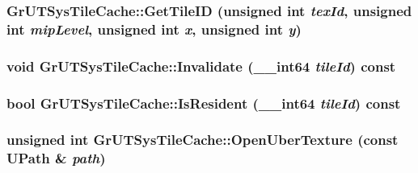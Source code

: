 \hypertarget{class_gr_u_t_sys_tile_cache_0ade69d8a7eb2491b6c19b5dba8f1866}{
\subsubsection[{GetTileID}]{ GrUTSysTileCache::GetTileID (unsigned int {\em texId}, \/  unsigned int {\em mipLevel}, \/  unsigned int {\em x}, \/  unsigned int {\em y})}}
\label{class_gr_u_t_sys_tile_cache_0ade69d8a7eb2491b6c19b5dba8f1866}


\hypertarget{class_gr_u_t_sys_tile_cache_3dec781213be39f8133dd38818ebf8fe}{
\subsubsection[{Invalidate}]{\setlength{\rightskip}{0pt plus 5cm}void GrUTSysTileCache::Invalidate ({\bf \_\-\_\-int64} {\em tileId}) const}}
\label{class_gr_u_t_sys_tile_cache_3dec781213be39f8133dd38818ebf8fe}


\hypertarget{class_gr_u_t_sys_tile_cache_d64362e1e41304db71b0804d7ea96c75}{
\subsubsection[{IsResident}]{\setlength{\rightskip}{0pt plus 5cm}bool GrUTSysTileCache::IsResident ({\bf \_\-\_\-int64} {\em tileId}) const}}
\label{class_gr_u_t_sys_tile_cache_d64362e1e41304db71b0804d7ea96c75}


\hypertarget{class_gr_u_t_sys_tile_cache_4da32a54ad566f5b56dc9f6883a714c6}{
\subsubsection[{OpenUberTexture}]{\setlength{\rightskip}{0pt plus 5cm}unsigned int GrUTSysTileCache::OpenUberTexture (const {\bf UPath} \& {\em path})}}
\label{class_gr_u_t_sys_tile_cache_4da32a54ad566f5b56dc9f6883a714c6}


